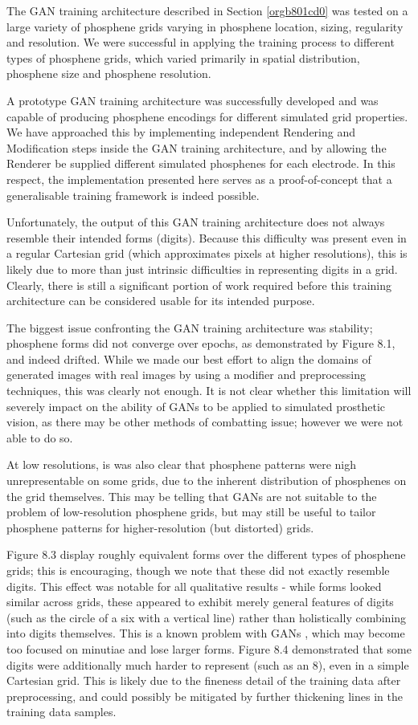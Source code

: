 \documentclass[a4paper,11pt,openany]{book}
\begin{document}
The GAN training architecture described in Section \ref{orgb801cd0}  was tested on a large variety of phosphene grids varying in phosphene location, sizing, regularity and resolution.
We were successful in applying the training process to different types of phosphene grids, which varied primarily in spatial distribution, phosphene size and phosphene resolution.

A prototype GAN training architecture was successfully developed and was capable of producing phosphene encodings for different simulated grid properties.
We have approached this by implementing independent Rendering and Modification steps inside the GAN training architecture, and by allowing the Renderer be supplied different simulated phosphenes for each electrode.
In this respect, the implementation presented here serves as a proof-of-concept that a generalisable training framework is indeed possible.

Unfortunately, the output of this GAN training architecture does not always resemble their intended forms (digits).
Because this difficulty was present even in a regular Cartesian grid (which approximates pixels at higher resolutions), this is likely due to more than just intrinsic difficulties in representing digits in a grid.
Clearly, there is still a significant portion of work required before this training architecture can be considered usable for its intended purpose.

The biggest issue confronting the GAN training architecture was stability; phosphene forms did not converge over epochs, as demonstrated by Figure 8.1, and indeed drifted.
While we made our best effort to align the domains of generated images with real images by using a modifier and preprocessing techniques, this was clearly not enough.
It is not clear whether this limitation will severely impact on the ability of GANs to be applied to simulated prosthetic vision, as there may be other methods of combatting issue; however we were not able to do so.

At low resolutions, is was also clear that phosphene patterns were nigh unrepresentable on some grids, due to the inherent distribution of phosphenes on the grid themselves.
This may be telling that GANs are not suitable to the problem of low-resolution phosphene grids, but may still be useful to tailor phosphene patterns for higher-resolution (but distorted) grids.

Figure 8.3 display roughly equivalent forms over the different types of phosphene grids; this is encouraging, though we note that these did not exactly resemble digits.
This effect was notable for all qualitative results - while forms looked similar across grids, these appeared to exhibit merely general features of digits (such as the circle of a six with a vertical line) rather than holistically combining into digits themselves.
This is a known problem with GANs \cite{NIPS2014_5423}, which may become too focused on minutiae and lose larger forms.
Figure 8.4 demonstrated that some digits were additionally much harder to represent (such as an 8), even in a simple Cartesian grid.
This is likely due to the fineness detail of the training data after preprocessing, and could possibly be mitigated by further thickening lines in the training data samples.
\end{document}

